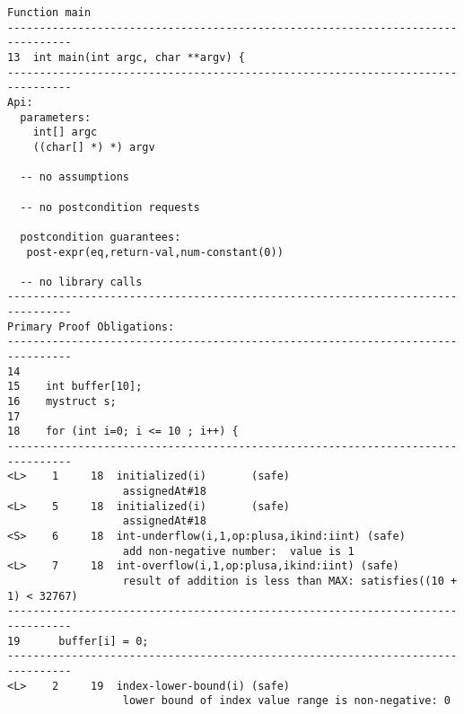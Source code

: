\documentclass[11pt]{article}
\begin{document}
\begin{scriptsize}
\begin{verbatim}
Function main
--------------------------------------------------------------------------------
13  int main(int argc, char **argv) {
--------------------------------------------------------------------------------
Api:
  parameters:
    int[] argc
    ((char[] *) *) argv

  -- no assumptions

  -- no postcondition requests

  postcondition guarantees:
   post-expr(eq,return-val,num-constant(0))

  -- no library calls
--------------------------------------------------------------------------------
Primary Proof Obligations:
--------------------------------------------------------------------------------
14
15    int buffer[10];
16    mystruct s;
17
18    for (int i=0; i <= 10 ; i++) {
--------------------------------------------------------------------------------
<L>    1     18  initialized(i)       (safe)
                  assignedAt#18
<L>    5     18  initialized(i)       (safe)
                  assignedAt#18
<S>    6     18  int-underflow(i,1,op:plusa,ikind:iint) (safe)
                  add non-negative number:  value is 1
<L>    7     18  int-overflow(i,1,op:plusa,ikind:iint) (safe)
                  result of addition is less than MAX: satisfies((10 + 1) < 32767)
--------------------------------------------------------------------------------
19      buffer[i] = 0;
--------------------------------------------------------------------------------
<L>    2     19  index-lower-bound(i) (safe)
                  lower bound of index value range is non-negative: 0


\end{verbatim}
\end{scriptsize}
\end{document}
